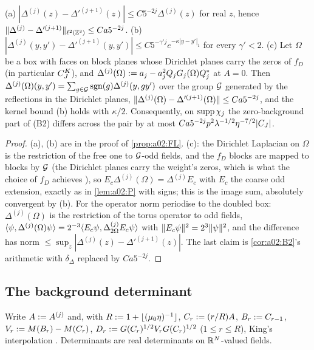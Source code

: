 \begin{proposition}\label{prop:a02:S}
(a) $|\Delta^{(j)}(z)-\Delta'^{(j+1)}(z)|\le C5^{-2j}\Delta^{(j)}(z)$ for real $z$, hence $\lVert \Delta^{(j)}-\Delta'^{(j+1)}\rVert_{\ell^2(\mathbb Z^3)}\le Ca5^{-2j}$. (b) $|\Delta^{(j)}(y,y')-\Delta'^{(j+1)}(y,y')|\le C5^{-\gamma'j}e^{-\kappa|y-y'|_1}$ for every $\gamma'<2$. (c) Let $\Omega$ be a box with faces on block planes whose Dirichlet planes carry the zeros of $f_D$ (in particular $C^{K}_{J}$), and $\Delta^{(j)}(\Omega):= a_j-a_j^2Q_jG_j(\Omega)Q_j^*$ at $A=0$. Then $\Delta^{(j)}(\Omega)(y,y')=\sum_{g\in\mathcal G}\operatorname{sgn}(g)\Delta^{(j)}(y,gy')$ over the group $\mathcal G$ generated by the reflections in the Dirichlet planes, $\lVert \Delta^{(j)}(\Omega)-\Delta'^{(j+1)}(\Omega)\rVert\le Ca5^{-2j}$, and the kernel bound (b) holds with $\kappa/2$. Consequently, on $\operatorname{supp}\chi_j$ the zero-background part of (B2) differs across the pair by at most $Ca5^{-2j}p^2\lambda^{-1/2}\eta^{-7/2}|C_J|$.
\end{proposition}
\begin{proof}
(a), (b) are in the proof of \cref{prop:a02:FL}. (c): the Dirichlet Laplacian on $\Omega$ is the restriction of the free one to $\mathcal G$-odd fields, and the $f_D$ blocks are mapped to blocks by $\mathcal G$ (the Dirichlet planes carry the weight's zeros, which is what the choice of $f_D$ achieves \cite[(3.8)--(3.9)]{K2}), so $E_c\Delta^{(j)}(\Omega)=\Delta^{(j)}E_c$ with $E_c$ the coarse odd extension, exactly as in \cref{lem:a02:P} with signs; this is the image sum, absolutely convergent by (b). For the operator norm periodise to the doubled box: $\Delta^{(j)}(\Omega)$ is the restriction of the torus operator to odd fields, $\langle \psi,\Delta^{(j)}(\Omega)\psi\rangle=2^{-3}\langle E_c\psi,\Delta^{(j)}_{2\Omega}E_c\psi\rangle$ with $\lVert E_c\psi\rVert^2=2^3\lVert \psi\rVert^2$, and the difference has norm $\le\sup_z|\Delta^{(j)}(z)-\Delta'^{(j+1)}(z)|$. The last claim is \cref{cor:a02:B2}'s arithmetic with $\delta_\Delta$ replaced by $Ca5^{-2j}$.
\end{proof}

\subsection{The background determinant}\label{ssec:a02:B3}

Write $A:= A^{(j)}$ and, with $R:=1+\lfloor(\mu_0\eta)^{-1}\rfloor$, $C_r:=(r/R)A$, $B_r:= C_{r-1}$, $V_r:= M(B_r)-M(C_r)$, $D_r:= G(C_r)^{1/2}V_rG(C_r)^{1/2}$ ($1\le r\le R$), King's interpolation \cite[(3.93)]{K1}. Determinants are real determinants on $\mathbb R^N$-valued fields.

